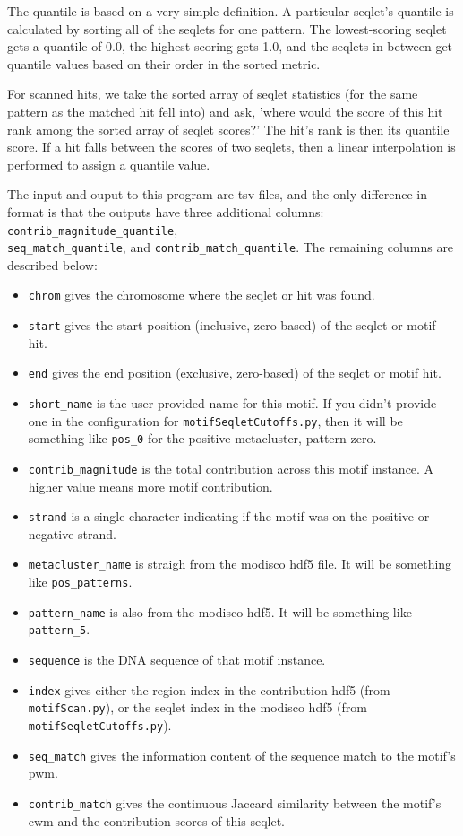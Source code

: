 \documentclass{article}
\begin{document}
The quantile is based on a very simple definition. A particular seqlet's quantile is calculated by
sorting all of the seqlets for one pattern. The lowest-scoring seqlet gets a quantile of 0.0,
the highest-scoring gets 1.0, and the seqlets in between get quantile values based on their
order in the sorted metric.

For scanned hits, we take the sorted array of seqlet statistics (for the same pattern
as the matched hit fell into) and ask, 'where would the score of this hit rank among
the sorted array of seqlet scores?'
The hit's rank is then its quantile score.
If a hit falls between the scores of two seqlets, then a linear interpolation
is performed to assign a quantile value.

The input and ouput to this program are tsv files, and the only difference in format
is that the outputs have three additional columns: \texttt{contrib\_magnitude\_quantile},\\
\texttt{seq\_match\_quantile}, and
\texttt{contrib\_match\_quantile}.
The remaining columns are described below:

\begin{itemize}
    \item \texttt{chrom} gives the chromosome where the seqlet or hit was found.
    \item \texttt{start} gives the start position (inclusive, zero-based) of the seqlet or
        motif hit.
    \item \texttt{end} gives the end position (exclusive, zero-based) of the seqlet or motif hit.
    \item \texttt{short\_name} is the user-provided name for this motif. If you didn't provide
        one in the configuration for \texttt{motifSeqletCutoffs.py}, then it will be something like \texttt{pos\_0}
        for the positive metacluster, pattern zero.
    \item \texttt{contrib\_magnitude} is the total contribution across this motif instance.
        A higher value means more motif contribution.
    \item \texttt{strand} is a single character indicating if the motif was on the positive
        or negative strand.
    \item \texttt{metacluster\_name} is straigh from the modisco hdf5 file. It will be
        something like \texttt{pos\_patterns}.
    \item \texttt{pattern\_name} is also from the modisco hdf5. It will be something
        like \texttt{pattern\_5}.
    \item \texttt{sequence} is the DNA sequence of that motif instance.
    \item \texttt{index} gives either the region index in the contribution hdf5
        (from \texttt{motifScan.py}), or the seqlet index in the modisco
        hdf5 (from \texttt{motifSeqletCutoffs.py}).
    \item \texttt{seq\_match} gives the information content of the sequence match to the motif's
        pwm.
    \item \texttt{contrib\_match} gives the continuous Jaccard similarity between the motif's
        cwm and the contribution scores of this seqlet.
\end{itemize}
\end{document}
